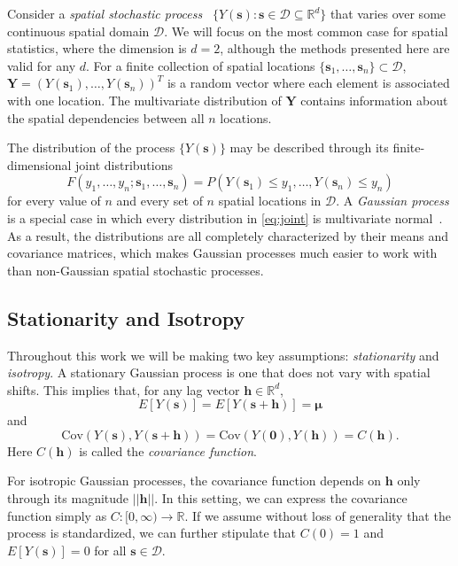 \documentclass[12pt]{article}
\begin{document}
Consider a \emph{spatial stochastic process}~\cite{gelfand2010handbook} $\{Y(\bm{s}): \bm{s} \in \mathcal{D} \subseteq \mathbb{R}^d\}$ that varies over some continuous spatial domain $\mathcal{D}$. We will focus on the most common case for spatial statistics, where the dimension is $d = 2$, although the methods presented here are valid for any $d$.  For a finite collection of spatial locations $\{\bm{s}_1, \dots, \bm{s}_n\} \subset \mathcal{D}$, $\bm{Y} = (Y(\bm{s}_1), \dots, Y(\bm{s}_n))^T$ is a random vector where each element is associated with one location. The multivariate distribution of $\bm{Y}$ contains information about the spatial dependencies between all $n$ locations.

The distribution of the process $\{Y(\bm{s})\}$ may be described through its finite-dimensional joint distributions
\begin{equation} \label{eq:joint}
F(y_1, \dots, y_n; \bm{s}_1, \dots, \bm{s}_n) = P(Y(\bm{s}_1) \leq y_1, \dots, Y(\bm{s}_n) \leq y_n)
\end{equation}
for every value of $n$ and every set of $n$ spatial locations in $\mathcal{D}$. A \emph{Gaussian process} is a special case in which every distribution in \eqref{eq:joint} is multivariate normal~\cite{gelfand2010handbook}. As a result, the distributions are all completely characterized by their means and covariance matrices, which makes Gaussian processes much easier to work with than non-Gaussian spatial stochastic processes.


\subsection{Stationarity and Isotropy} %
\label{sec:stationarity_and_isotropy}

Throughout this work we will be making two key assumptions:  \emph{stationarity} and \emph{isotropy}. A stationary Gaussian process is one that does not vary with spatial shifts. This implies that, for any lag vector $\bm{h} \in \mathbb{R}^d$,
\[
E[Y(\bm{s})] = E[Y(\bm{s} + \bm{h})] = \bm{\mu}
\]
and
\[
\textrm{Cov}(Y(\bm{s}), Y(\bm{s} + \bm{h})) = \textrm{Cov}(Y(\bm{0}), Y(\bm{h})) = C(\bm{h}).
\]
Here $C(\bm{h})$ is called the \emph{covariance function}.

For isotropic Gaussian processes, the covariance function depends on $\bm{h}$ only through its magnitude $||\bm{h}||$. In this setting, we can express the covariance function simply as $C: [0, \infty) \to \mathbb{R}$. If we assume without loss of generality that the process is standardized, we can further stipulate that $C(0) = 1$ and $E[Y(\bm{s})] = 0$ for all $\bm{s} \in \mathcal{D}$.
\end{document}

